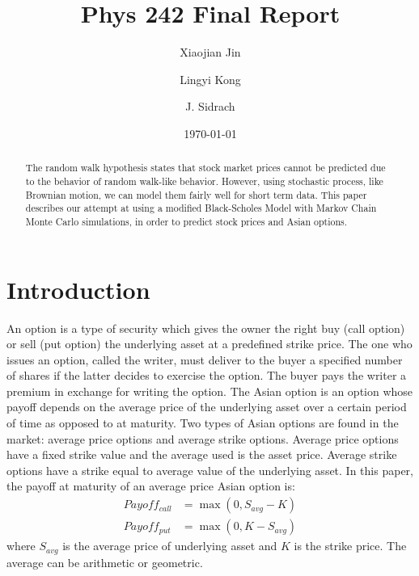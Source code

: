 \documentclass[%
 reprint,
 amsmath,amssymb,
 aps,
 nofootinbib,
 showpacs
]{revtex4-1}
\begin{document}

\title{Phys 242 Final Report}%

\author{Xiaojian Jin}
\author{Lingyi Kong}
\author{J. Sidrach}
%

\date{\today}

\begin{abstract}
The random walk hypothesis states that stock market prices cannot be predicted due to the behavior of random walk-like behavior. However, using stochastic process, like Brownian motion, we can model them fairly well for short term data. This paper describes our attempt at using a modified Black-Scholes Model with Markov Chain Monte Carlo simulations, in order to predict stock prices and Asian options.
\end{abstract}

\maketitle

\section{\label{sec:introduction}Introduction}

An option is a type of security which gives the owner the right buy (call option) or sell (put option) the underlying asset at a predefined strike price.
The one who issues an option, called the writer, must deliver to the buyer a specified number of shares if the latter decides to exercise the option. The buyer pays the writer a premium in exchange for writing the option.
The Asian option is an option whose payoff depends on the average price of the underlying asset over a certain period of time as opposed to at maturity.
Two types of Asian options are found in the market: average price options and average strike options. Average price options have a fixed strike value and the average used is the asset price.
Average strike options have a strike equal to average value of the underlying asset.
In this paper, the payoff at maturity of an average price Asian option is:
\begin{align*}
Payoff_{call} &= \max (0, S_{avg} -K) \\
Payoff_{put} &= \max (0, K-S_{avg})
\end{align*}
where $S_{avg}$ is the average price of underlying asset and $K$ is the strike price.
The average can be arithmetic or geometric.
\end{document}
